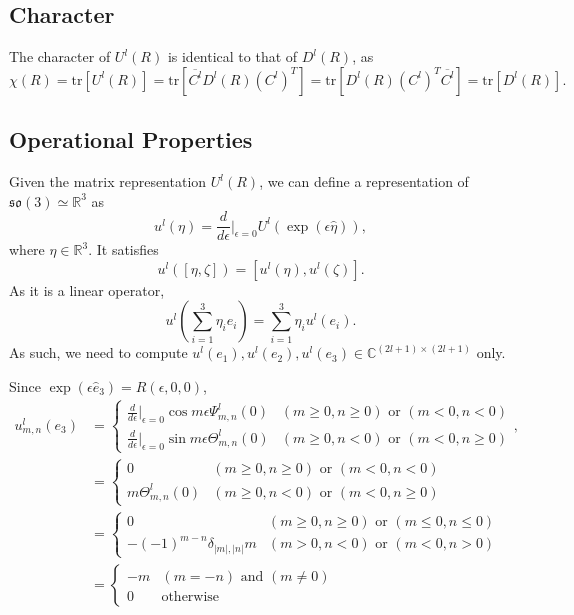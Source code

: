 \documentclass[onecolumn,11pt]{IEEEtran}
\newcommand{\trs}[1]{\mathrm{tr}\ensuremath{[#1]}}
\newcommand{\so}{\ensuremath{\mathfrak{so}(3)}}
\renewcommand{\Re}{\ensuremath{\mathbb{R}}}
\newcommand{\Cp}{\ensuremath{\mathbb{C}}}
\begin{document}
\subsection{Character}

The character of $U^l(R)$ is identical to that of $D^l(R)$, as
\[
    \chi(R) = \trs{U^l(R)} = \trs{ \overline{C^l} D^l(R) (C^l)^T } = \trs{D^l(R) (C^l)^T \overline{C^l}} = \trs{D^l(R)}.
\]

\subsection{Operational Properties}

Given the matrix representation $U^l(R)$, we can define a representation of $\so\simeq \Re^3$ as
\[
u^l(\eta)= \frac{d}{d\epsilon}\bigg|_{\epsilon=0} U^l(\exp(\epsilon\hat\eta)),
\]
where $\eta\in\Re^3$. It satisfies
\[
u^l([\eta,\zeta])=[u^l(\eta),u^l(\zeta)].
\]
As it is a linear operator,
\[
u^l(\sum_{i=1}^3 \eta_i e_i) = \sum_{i=1}^3 \eta_i u^l(e_i).
\]
As such, we need to compute $u^l(e_1),u^l(e_2),u^l(e_3)\in\Cp^{(2l+1)\times(2l+1)}$ only.

Since $\exp(\epsilon\hat e_3) = R(\epsilon,0,0)$,
\begin{align}
    u^l_{m,n}(e_3) & =
    \begin{cases}
        \frac{d}{d\epsilon}\bigg|_{\epsilon=0} \cos m\epsilon \Psi^l_{m,n}(0) & (m\geq 0, n\geq 0) \text{ or } (m<0,n<0)\\
        \frac{d}{d\epsilon}\bigg|_{\epsilon=0} \sin m\epsilon \Theta^l_{m,n} (0) & (m\geq 0, n < 0) \text{ or } (m<0,n\geq0)
    \end{cases},\nonumber\\
    & =
    \begin{cases}
        0 & (m\geq 0, n\geq 0) \text{ or } (m<0,n<0)\\
        m \Theta^l_{m,n} (0) & (m\geq 0, n < 0) \text{ or } (m<0,n\geq0)
    \end{cases}\nonumber\\
    & =
    \begin{cases}
        0 & (m\geq 0, n\geq 0) \text{ or } (m \leq 0, n \leq 0)\\
        -(-1)^{m-n}\delta_{|m|,|n|}m & (m > 0, n < 0) \text{ or } (m < 0, n >0)
    \end{cases}\nonumber\\
    & =
    \begin{cases}
        -m  & (m=-n) \text{ and } (m \neq 0)\\
        0 & \text{otherwise}
    \end{cases}
\end{align}
\end{document}
